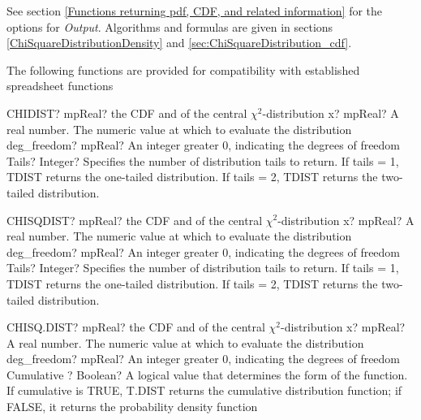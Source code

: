 \vspace{0.3cm}
See section \ref{Functions returning pdf, CDF, and related information} for the options for {\itshape\sffamily Output}. Algorithms and formulas are given in sections \ref{ChiSquareDistributionDensity} and \ref{sec:ChiSquareDistribution_cdf}.



\vspace{0.3cm}
The following functions are provided for compatibility with established spreadsheet functions

\vspace{0.3cm}
\begin{mpFunctionsExtract}
	\mpWorksheetFunctionThreeNotImplemented
	{CHIDIST? mpReal? the CDF and of the central $\chi^2$-distribution}
	{x? mpReal? A real number. The numeric value at which to evaluate the distribution}
	{deg\_freedom? mpReal? An integer  greater 0, indicating the degrees of freedom}
	{Tails? Integer? Specifies the number of distribution tails to return. If tails = 1, TDIST returns the one-tailed distribution. If tails = 2, TDIST returns the two-tailed distribution.}
\end{mpFunctionsExtract}

\vspace{0.6cm}
\begin{mpFunctionsExtract}
	\mpWorksheetFunctionThreeNotImplemented
	{CHISQDIST? mpReal? the CDF and of the central $\chi^2$-distribution}
	{x? mpReal? A real number. The numeric value at which to evaluate the distribution}
	{deg\_freedom? mpReal? An integer  greater 0, indicating the degrees of freedom}
	{Tails? Integer? Specifies the number of distribution tails to return. If tails = 1, TDIST returns the one-tailed distribution. If tails = 2, TDIST returns the two-tailed distribution.}
\end{mpFunctionsExtract}


\vspace{0.6cm}
\begin{mpFunctionsExtract}
	\mpWorksheetFunctionThreeNotImplemented
	{CHISQ.DIST? mpReal? the CDF and of the central $\chi^2$-distribution}
	{x? mpReal? A real number. The numeric value at which to evaluate the distribution}
	{deg\_freedom? mpReal? An integer  greater 0, indicating the degrees of freedom}
	{Cumulative ? Boolean? A logical value that determines the form of the function. If cumulative is TRUE, T.DIST returns the cumulative distribution function; if FALSE, it returns the probability density function}
\end{mpFunctionsExtract}

